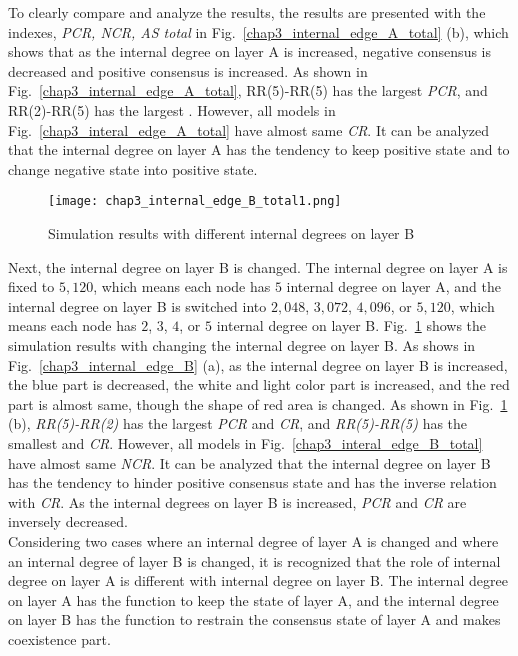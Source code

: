 To clearly compare and analyze the results, the results are presented with the indexes, \textit{PCR, NCR, AS total} in Fig.~\ref{chap3_internal_edge_A_total} (b), which shows that as the internal degree on layer A is increased, negative consensus is decreased and positive consensus is increased. As shown in Fig.~\ref{chap3_internal_edge_A_total}, RR(5)-RR(5) has the largest \textit{PCR}, and RR(2)-RR(5) has the largest . However, all models in Fig.~\ref{chap3_interal_edge_A_total} have almost same \textit{CR}. It can be analyzed that the internal degree on layer A has the tendency to keep positive state and to change negative state into positive state. 
\begin{figure}[!htb]
	\centering
	\texttt{[image: chap3\_internal\_edge\_B\_total1.png]}
	\caption{Simulation results with different internal degrees on layer B}
	\label{chap3_internal_edge_B_total}
\end{figure}
Next, the internal degree on layer B is changed. The internal degree on layer A is fixed to  $5,120$, which means each node has $5$ internal degree on layer A, and the internal degree on layer B is switched into $2,048$, $3,072$, $4,096$, or $5,120$, which means each node has $2$, $3$, $4$, or $5$ internal degree on layer B.  
Fig.~\ref{chap3_internal_edge_B_total} shows the simulation results with changing the internal degree on layer B. As shows in Fig.~\ref{chap3_internal_edge_B} (a), as the internal degree on layer B is increased, the blue part is decreased, the white and light color part is increased, and the red part is almost same, though the shape of red area is changed.  As shown in Fig.~\ref{chap3_internal_edge_B_total} (b), \textit{RR(5)-RR(2)} has the largest \textit{PCR} and \textit{CR}, and \textit{RR(5)-RR(5)} has the smallest  and \textit{CR}. However, all models in Fig.~\ref{chap3_interal_edge_B_total} have almost same \textit{NCR}. It can be analyzed that the internal degree on layer B has the tendency to hinder positive consensus state and has the inverse relation with \textit{CR}. As the internal degrees on layer B is increased, \textit{PCR} and \textit{CR} are inversely decreased.\\ 
Considering two cases where an internal degree of layer A is changed and where an internal degree of layer B is changed, it is recognized that the role of internal degree on layer A is different with internal degree on layer B. The internal degree on layer A has the function to keep the state of layer A, and the internal degree on layer B has the function to restrain the consensus state of layer A and makes coexistence part. 
